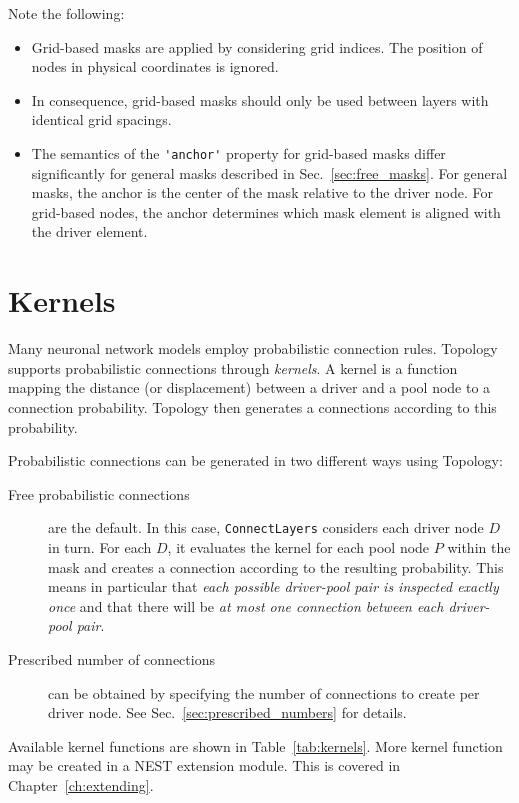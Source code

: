 \documentclass[a4paper,12pt]{report}
\begin{document}
Note the following:
\begin{itemize}
\item Grid-based masks are applied by considering grid indices. The
  position of nodes in physical coordinates is ignored.
\item In consequence, grid-based masks should only be used between
  layers with identical grid spacings. 
\item The semantics of the \lstinline!'anchor'! property for
grid-based masks differ
significantly for general masks described in
Sec.~\ref{sec:free_masks}. For general masks, the anchor is the center
of the mask relative to the driver node. For grid-based nodes, the
anchor determines which mask element is aligned with the driver element.
\end{itemize}


\section{Kernels}\label{sec:conn_kernels}

Many neuronal network models employ probabilistic connection
rules. Topology supports
probabilistic connections through \emph{kernels}. A
kernel is a function mapping the distance (or displacement) between a
driver and a pool node to a connection probability. Topology then
generates a connections according to this probability.

Probabilistic connections can be generated in two different ways using
Topology:
\begin{description}
\item[Free probabilistic connections] are the default. 
  In this case, \lstinline!ConnectLayers! considers each driver node $D$
  in turn. For each $D$, it evaluates the kernel for each
  pool node $P$ within the mask and creates a connection according to
  the resulting probability. This means in particular that \emph{each
    possible driver-pool pair is inspected exactly once} and that
  there will be \emph{at most one connection between each driver-pool pair}.
\item[Prescribed number of connections] can be obtained by specifying
  the number of connections to create per driver node. See
  Sec.~\ref{sec:prescribed_numbers} for details.
\end{description}

Available kernel functions are shown in Table~\ref{tab:kernels}. More
kernel function may be created in a NEST extension module. This is covered
in Chapter~\ref{ch:extending}.
\end{document}
